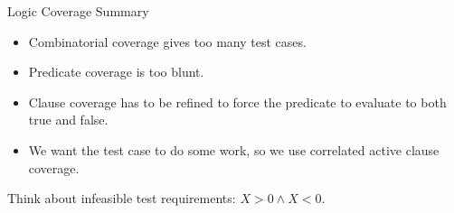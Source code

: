 \documentclass{beamer}
\begin{document}
\begin{frame}{Logic Coverage Summary}
  \begin{itemize}
  \item Combinatorial coverage gives too many test cases.
  \item Predicate coverage is too blunt.
  \item Clause coverage has to be refined to force the predicate to
    evaluate to both true and false.
  \item We want the test case to do some work, so we use correlated
    active clause coverage.
  \end{itemize}
  Think about infeasible   test requirements: $X>0 \land X<0$.
\end{frame}
\end{document}

